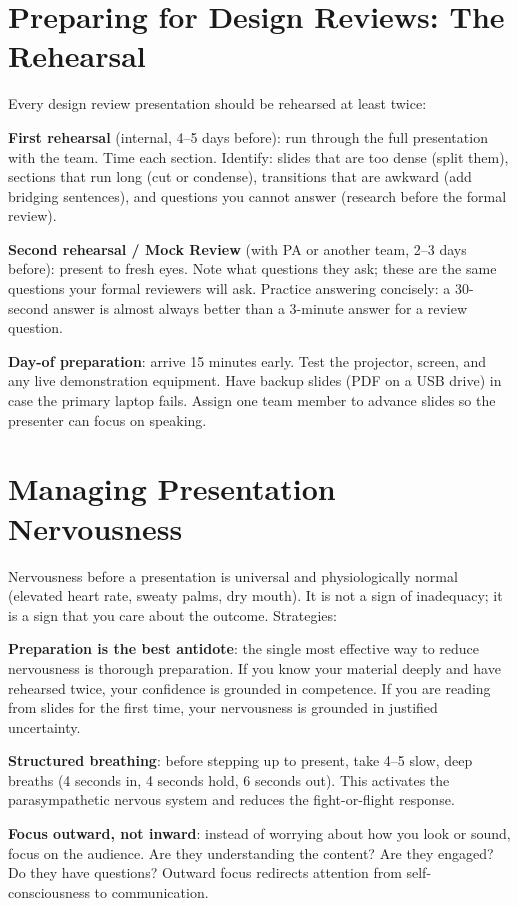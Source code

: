 \section{Preparing for Design Reviews: The Rehearsal}
Every design review presentation should be rehearsed at least twice:

\textbf{First rehearsal} (internal, 4--5 days before): run through the full presentation with the team. Time each section. Identify: slides that are too dense (split them), sections that run long (cut or condense), transitions that are awkward (add bridging sentences), and questions you cannot answer (research before the formal review).

\textbf{Second rehearsal / Mock Review} (with PA or another team, 2--3 days before): present to fresh eyes. Note what questions they ask; these are the same questions your formal reviewers will ask. Practice answering concisely: a 30-second answer is almost always better than a 3-minute answer for a review question.

\textbf{Day-of preparation}: arrive 15 minutes early. Test the projector, screen, and any live demonstration equipment. Have backup slides (PDF on a USB drive) in case the primary laptop fails. Assign one team member to advance slides so the presenter can focus on speaking.

\section{Managing Presentation Nervousness}
Nervousness before a presentation is universal and physiologically normal (elevated heart rate, sweaty palms, dry mouth). It is not a sign of inadequacy; it is a sign that you care about the outcome. Strategies:

\textbf{Preparation is the best antidote}: the single most effective way to reduce nervousness is thorough preparation. If you know your material deeply and have rehearsed twice, your confidence is grounded in competence. If you are reading from slides for the first time, your nervousness is grounded in justified uncertainty.

\textbf{Structured breathing}: before stepping up to present, take 4--5 slow, deep breaths (4 seconds in, 4 seconds hold, 6 seconds out). This activates the parasympathetic nervous system and reduces the fight-or-flight response.

\textbf{Focus outward, not inward}: instead of worrying about how you look or sound, focus on the audience. Are they understanding the content? Are they engaged? Do they have questions? Outward focus redirects attention from self-consciousness to communication.

